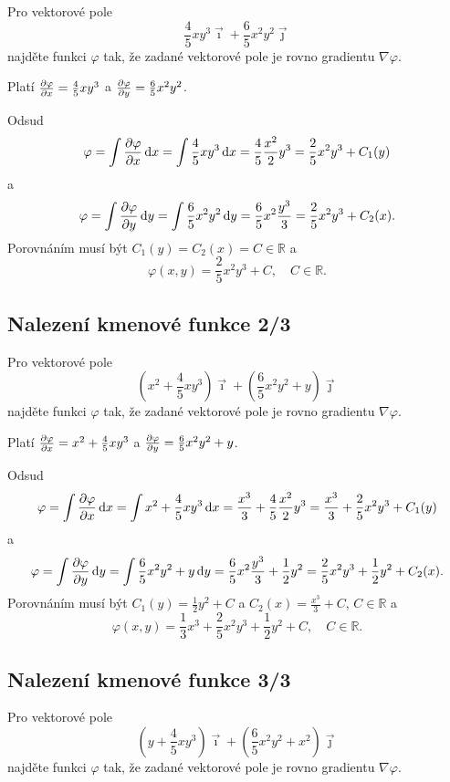 Pro vektorové pole $$\frac 45 x y^3\vec \imath + \frac 65x^2y^2\vec\jmath$$ najděte funkci $\varphi$ tak, že zadané vektorové pole je rovno gradientu $\nabla \varphi.$

\reseni

Platí $\pdv {\varphi}{x}=\frac 45 xy^3$ a $\pdv{\varphi}{y}=\frac 65 x^2y^2$.

Odsud
$$\varphi =\int \pdv{\varphi}{x} \,\mathrm dx=\int \frac 45 xy^3 \,\mathrm dx
=\frac 45 \frac {x^2}{2}y^3=\frac 25 x^2y^3+C_1(y)$$
a
$$\varphi =\int \pdv{\varphi}{y} \,\mathrm dy=\int \frac 65 x^2y^2 \,\mathrm dy
=\frac 65 {x^2}\frac{y^3}3=\frac 25 x^2y^3+C_2(x).$$
Porovnáním musí být $C_1(y)=C_2(x)=C\in\mathbb R$ a
$$\varphi(x,y)=\frac 25 x^2y^3+C,\quad C\in\mathbb R.$$


\konec

\subsection{Nalezení kmenové funkce 2/3}

Pro vektorové pole $$\left(x^2+\frac 45 x y^3\right)\vec \imath + \left(\frac 65x^2y^2+y\right)\vec\jmath$$ najděte funkci $\varphi$ tak, že zadané vektorové pole je rovno gradientu $\nabla \varphi.$

\reseni

Platí $\pdv {\varphi}{x}=x^2+\frac 45 xy^3$ a $\pdv{\varphi}{y}=\frac 65 x^2y^2+y$.

Odsud
$$\varphi =\int \pdv{\varphi}{x} \,\mathrm dx=\int x^2+\frac 45 xy^3 \,\mathrm dx
=\frac {x^3}3+\frac 45 \frac {x^2}{2}y^3=\frac {x^3}3+\frac 25 x^2y^3+C_1(y)$$
a
$$\varphi =\int \pdv{\varphi}{y} \,\mathrm dy=\int \frac 65 x^2y^2 +y \,\mathrm dy
=\frac 65 {x^2}\frac{y^3}{3}+\frac 12 y^2=\frac 25 x^2y^3+\frac 12 y^2 + C_2(x).$$
Porovnáním musí být $C_1(y)=\frac 12 y^2+C$ a $C_2(x)=\frac {x^3}3+C$, $C\in\mathbb R$ a
$$\varphi(x,y)=\frac {1}{3}x^3+\frac 25 x^2y^3+\frac 12 y^2+C,\quad C\in\mathbb R.$$

\konec

\subsection{Nalezení kmenové funkce 3/3}

Pro vektorové pole $$\left(y+\frac 45 x y^3\right)\vec \imath + \left(\frac 65x^2y^2+x^2\right)\vec\jmath$$ najděte funkci $\varphi$ tak, že zadané vektorové pole je rovno gradientu $\nabla \varphi.$



